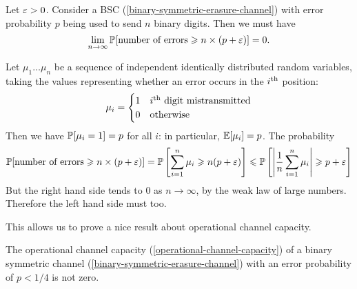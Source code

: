 \documentclass{article}
\begin{document}
\begin{proposition}
	\label{error-rate-bound}
    Let $\eps > 0$.
    Consider a BSC (\ref{binary-symmetric-erasure-channel}) with error probability $p$
    being used to send $n$ binary digits. Then we must have
    \[
	\lim_{n \to \infty} \P[\text{number of errors} \geq n \times (p + \eps)] = 0.
	\]
\end{proposition}

\begin{prf}
    Let $\mu_1 \dots \mu_n$
    be a sequence of independent identically distributed random variables,
    taking the values representing whether an error occurs in the $i\th$ position:
    \[
	\mu_i = \begin{cases}
		1 & i\th \text{ digit mistransmitted} \\
		0 & \!\otherwise
	\end{cases}
	\]
	Then we have $\P[\mu_i = 1] = p$ for all $i$:
	in particular, $\E[\mu_i] = p$. The probability
	\[
	\P[\text{number of errors} \geq n \times (p + \eps)] =
	\P \left[ \sum_{i=1}^n \mu_i \geq n(p + \eps)\right] \leq
	\P \left[ \abs{\frac{1}{n} \sum_{i=1}^n \mu_i} \geq p + \eps \right]
	\]
	But the right hand side tends to 0 as $n \to \infty$,
	by the weak law of large numbers.
	Therefore the left hand side must too.
\end{prf}

This allows us to prove a nice result about operational channel capacity.

\begin{proposition}
	\label{nonzero-channel-capacity}
    The operational channel capacity (\ref{operational-channel-capacity})
    of a binary symmetric channel (\ref{binary-symmetric-erasure-channel})
    with an error probability of $p < 1/4$ is not zero.
\end{proposition}
\end{document}
